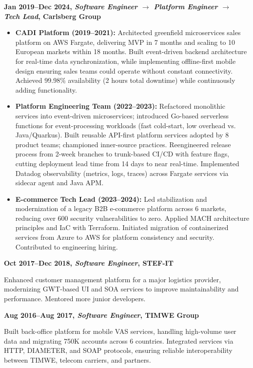 \documentclass[a4paper,12pt]{memoir}
\newcommand{\SmallSep}{\vspace{0.5em}}
\newcommand{\CVItem}[2]{\textbf{\color{RoyalBlue} #1}\par\small{#2}\SmallSep}
\begin{document}
\CVItem{Jan 2019–Dec 2024, \textit{Software Engineer $\rightarrow$ Platform Engineer $\rightarrow$ Tech Lead}, Carlsberg Group}{
\begin{itemize}[leftmargin=*,label={•},itemsep=0.3em]
    \item \textbf{CADI Platform (2019–2021):} Architected greenfield microservices sales platform on AWS Fargate, delivering MVP in 7 months and scaling to 10 European markets within 18 months. Built event-driven backend architecture for real-time data synchronization, while implementing offline-first mobile design ensuring sales teams could operate without constant connectivity. Achieved 99.98\% availability (2 hours total downtime) while continuously adding functionality.
    
    \item \textbf{Platform Engineering Team (2022–2023):} Refactored monolithic services into event-driven microservices; introduced Go-based serverless functions for event-processing workloads (fast cold-start, low overhead vs. Java/Quarkus). Built reusable API-first platform services adopted by 8 product teams; championed inner-source practices. Reengineered release process from 2-week branches to trunk-based CI/CD with feature flags, cutting deployment lead time from 14 days to near real-time. Implemented Datadog observability (metrics, logs, traces) across Fargate services via sidecar agent and Java APM.
    
    \item \textbf{E-commerce Tech Lead (2023–2024):} Led stabilization and modernization of a legacy B2B e-commerce platform across 6 markets, reducing over 600 security vulnerabilities to zero. Applied MACH architecture principles and IaC with Terraform. Initiated migration of containerized services from Azure to AWS for platform consistency and security. Contributed to engineering hiring.
\end{itemize}
}

\CVItem{Oct 2017–Dec 2018, \textit{Software Engineer}, STEF-IT}{
Enhanced customer management platform for a major logistics provider, modernizing GWT-based UI and SOA services to improve maintainability and performance. Mentored more junior developers.
}

\CVItem{Aug 2016–Aug 2017, \textit{Software Engineer}, TIMWE Group}{
Built back-office platform for mobile VAS services, handling high-volume user data and migrating 750K accounts across 6 countries. Integrated services via HTTP, DIAMETER, and SOAP protocols, ensuring reliable interoperability between TIMWE, telecom carriers, and partners.
}
\end{document}
